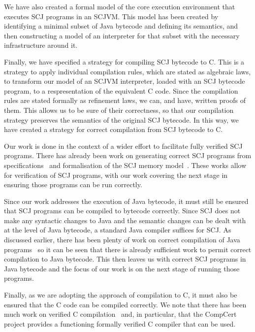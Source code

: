 We have also created a formal model of the core execution environment
that executes SCJ programs in an SCJVM.
This model has been created by identifying a minimal subset of Java
bytecode and defining its semantics, and then constructing a \Circus{}
model of an interpreter for that subset with the necessary
infrastructure around it.

Finally, we have specified a strategy for compiling SCJ bytecode to
C.
This is a strategy to apply individual compilation rules, which are
stated as algebraic laws, to transform our model of an SCJVM
interpreter, loaded with an SCJ bytecode program, to a \Circus{}
respresentation of the equivalent C code.
Since the compilation rules are stated formally as \Circus{}
refinement laws, we can, and have, written proofs of them.
This allows us to be sure of their correctness, so that our
compilation strategy preserves the semantics of the original SCJ
bytecode.
In this way, we have created a strategy for correct compilation from
SCJ bytecode to C.

Our work is done in the context of a wider effort to facilitate fully
verified SCJ programs.
There has already been work on generating correct SCJ programs from
\Circus{} specifications~\cite{cavalcanti2011, cavalcanti2013} and
formalisation of the SCJ memory model~\cite{cavalcanti2011a}.
These works allow for verification of SCJ programs, with our work
covering the next stage in ensuring those programs can be run
correctly.

Since our work addresses the execution of Java bytecode, it must still
be ensured that SCJ programs can be compiled to bytecode correctly.
Since SCJ does not make any syntactic changes to Java and the
semantic changes can be dealt with at the level of Java bytecode, a
standard Java compiler suffices for SCJ.
As discussed earlier, there has been plenty of work on correct
compilation of Java programs~\cite{klein2006, strecker2002,
  lochbihler2010, duran2005, stark2001} so it can be seen that there
is already sufficient work to permit correct compilation to Java
bytecode.
This then leaves us with correct SCJ programs in Java bytecode and the
focus of our work is on the next stage of running those programs.

Finally, as we are adopting the approach of compilation to C, it must
also be ensured that the C code can be compiled correctly.
We note that there has been much work on verified C
compilation~\cite{leroy2009a, leroy2009b, leroy2012, leinenbach2005,
  blazy2006} and, in particular, that the CompCert project provides a
functioning formally verified C compiler that can be used.

